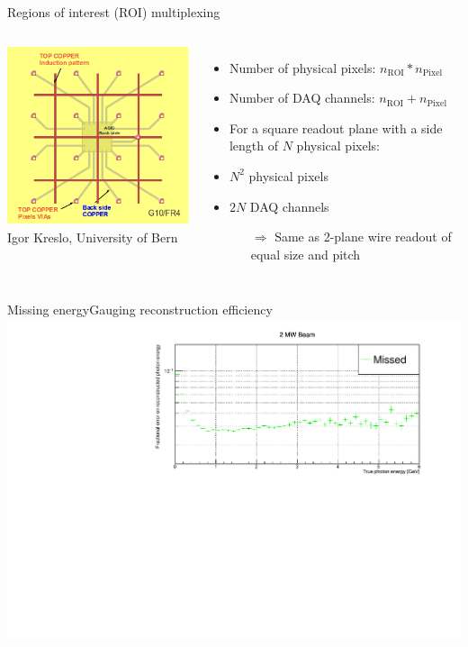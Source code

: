 \documentclass[]{beamer}
\newcommand*{\m}{\mathrm}
\newcommand*{\emphcol}{blue}
\begin{document}
\begin{frame}{Regions of interest (ROI) multiplexing}
	\begin{columns}[c]
		\centering
		\includegraphics[width=\textwidth]{defence/roi}\\
		{\tiny Igor Kreslo, University of Bern}\\
		\begin{itemize}
			\item Number of physical pixels: {\color{\emphcol} $n_{\m{ROI}} * n_{\m{Pixel}}$}
			\item Number of DAQ channels: {\color{\emphcol} $n_{\m{ROI}} + n_{\m{Pixel}}$}
			\item For a square readout plane with a side length of $N$ physical pixels:
			\item $N ^ 2$ physical pixels
			\item $2 N$ DAQ channels
			\begin{itemize}
				\item[$\Rightarrow$] Same as 2-plane wire readout of equal size and pitch
			\end{itemize}
		\end{itemize}
	\end{columns}
\end{frame}

\begin{frame}{Missing energy}{Gauging reconstruction efficiency}
	\centering
	\includegraphics[width=\textwidth]{pile-up/2MW/missed_rel_x}
\end{frame}
\end{document}
